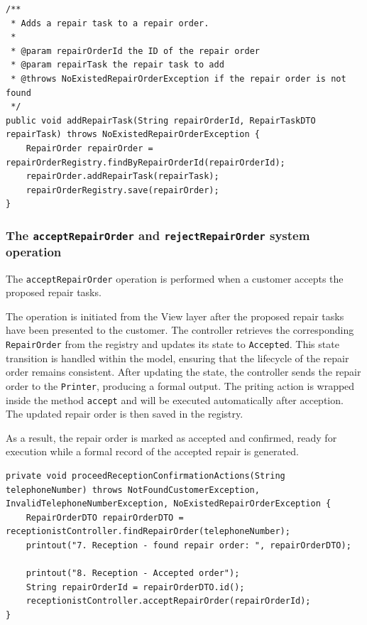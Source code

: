 \documentclass[a4paper]{scrartcl}
\begin{document}
\begin{lstlisting}[style=javastyle, caption={Add repair task using \texttt{addRepairTask} method in \texttt{TechnicianController}}]
/**
 * Adds a repair task to a repair order.
 *
 * @param repairOrderId the ID of the repair order
 * @param repairTask the repair task to add
 * @throws NoExistedRepairOrderException if the repair order is not found
 */
public void addRepairTask(String repairOrderId, RepairTaskDTO repairTask) throws NoExistedRepairOrderException {
    RepairOrder repairOrder = repairOrderRegistry.findByRepairOrderId(repairOrderId);
    repairOrder.addRepairTask(repairTask);
    repairOrderRegistry.save(repairOrder);
}
\end{lstlisting}

\subsubsection{The \texttt{acceptRepairOrder} and \texttt{rejectRepairOrder} system operation}

The \texttt{acceptRepairOrder} operation is performed when a customer accepts the proposed repair tasks.

The operation is initiated from the View layer after the proposed repair tasks have been presented to the customer. The controller retrieves the corresponding \texttt{RepairOrder} from the registry and updates its state to \texttt{Accepted}. This state transition is handled within the model, ensuring that the lifecycle of the repair order remains consistent. After updating the state, the controller sends the repair order to the \texttt{Printer}, producing a formal output. The priting action is wrapped inside the method \texttt{accept} and will be executed automatically after acception. The updated repair order is then saved in the registry.

As a result, the repair order is marked as accepted and confirmed, ready for execution while a formal record of the accepted repair is generated.

\begin{lstlisting}[style=javastyle, caption={Internal method \texttt{proceedReceptionConfirmationActions} in \texttt{View} that handles receptionist confirmation tasks}]
private void proceedReceptionConfirmationActions(String telephoneNumber) throws NotFoundCustomerException, InvalidTelephoneNumberException, NoExistedRepairOrderException {
    RepairOrderDTO repairOrderDTO = receptionistController.findRepairOrder(telephoneNumber);
    printout("7. Reception - found repair order: ", repairOrderDTO);

    printout("8. Reception - Accepted order");
    String repairOrderId = repairOrderDTO.id();
    receptionistController.acceptRepairOrder(repairOrderId);
}
\end{lstlisting}
\end{document}
